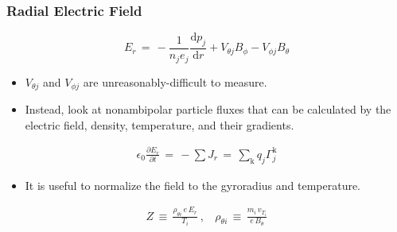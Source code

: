 \documentclass[10pt]{beamer}
\begin{document}
\begin{frame} %
\frametitle{Radial Electric Field}
\begin{equation} %
	E_r \,=\, -\frac{1}{n_j e_j} \frac{\text{d} p_j}{\text{d} r} + V_{\theta j} B_\phi - V_{\phi j} B_\theta
	\label{eq:E_r}
\end{equation}
\begin{itemize}
	\item $V_{\theta j}$ and $V_{\phi j}$ are unreasonably-difficult to measure.
	\item Instead, look at nonambipolar particle fluxes that can be calculated by the electric field, density, temperature, and their gradients.
\end{itemize}
\begin{align} %
	\epsilon_0 \frac{\partial E_r}{\partial t} \,=\, -\sum J_r \,=\,
		\sum_\text{k} q_j\Gamma_j^\text{k} \label{eq:ambipolarity_constraint}
\end{align}
\begin{itemize}
	\item It is useful to normalize the field to the gyroradius and temperature.
\end{itemize}
\begin{align} %
	Z \,\equiv\, \frac{\rho_{\theta i} \, e \, E_r}{T_i}~, ~~~~
		\rho_{\theta i} \,\equiv\, \frac{m_i \, v_{T_i}}{e \, B_\theta}
		\label{eq:Z_and_rho_definitions}
\end{align}
\end{frame}

\end{document}
